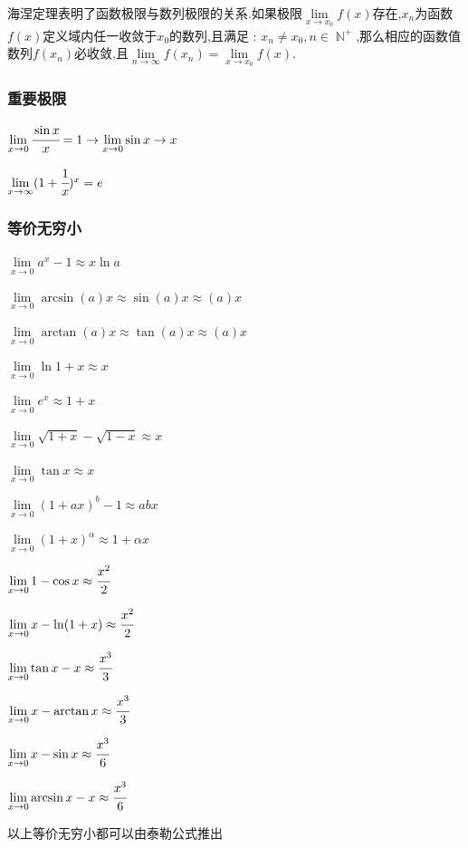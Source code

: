 \documentclass[UTF8,12pt]{ctexbook}
\newcommand{\limNormal}[1]{\lim\limits_{#1}}
\newcommand{\myLimToZero}{\limNormal{x \to 0}}
\newcommand{\myLimToInf}{\limNormal{x \to \infty}}
\newcommand{\defFunction}[1]{f(#1)}
\DeclareMathOperator{\mathNatureNumberCollection}{\mathbb{N}}
\begin{document}
{{{{\begin{enumerate}
{            海涅定理表明了函数极限与数列极限的关系.如果极限$\limNormal{x \to x_0}\defFunction{x}$存在,${x_n}$为函数$\defFunction{x}$定义域内任一收敛于$x_0$的数列,且满足 : $x_n \neq x_0,n \in \mathNatureNumberCollection^+$,那么相应的函数值数列${\defFunction{x_n}}$必收敛,且$\limNormal{n \to \infty}\defFunction{x_n} = \limNormal{x \to x_0}\defFunction{x}$.
            }
    \end{enumerate}
  }%

  \subsubsection{重要极限}{
    $\myLimToZero\cfrac{\sin{x}}{x}=1 \to \limNormal{x \to 0}\sin{x} \to x$

    $\myLimToInf(1+\cfrac{1}{x})^x = e$
  }%

  \subsubsection{等价无穷小}{
    $\myLimToZero a^x - 1 \approx x\ln{a}$

    $\myLimToZero \arcsin(a)x \approx \sin(a)x \approx (a)x$

    $\myLimToZero \arctan(a)x \approx \tan(a)x \approx (a)x$

    $\myLimToZero \ln1+x \approx x$

    $\myLimToZero e^x \approx 1+x$

    $\myLimToZero \sqrt{1 + x} - \sqrt{1 - x} \approx x$

    $\myLimToZero \tan{x} \approx x$

    $\myLimToZero (1 + ax)^b - 1 \approx abx$

    $\myLimToZero (1+x)^\alpha \approx 1+\alpha x$

    $\myLimToZero 1 - \cos x \approx \cfrac{x^2}{2}$

    $\myLimToZero x - \ln(1 + x) \approx \cfrac{x^2}{2}$

    $\myLimToZero \tan x - x \approx \cfrac{x^3}{3}$

    $\myLimToZero x - \arctan x \approx \cfrac{x^3}{3}$

    $\myLimToZero x - \sin x \approx \cfrac{x^3}{6}$

    $\myLimToZero \arcsin x - x \approx \cfrac{x^3}{6}$

    以上等价无穷小都可以由泰勒公式推出
  }%

}%

}}
\end{document}
